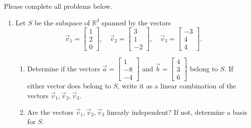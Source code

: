 \documentclass[12pt]{article}
\newcommand{\R}{\mathbb{R}}
\newcommand{\bbm}{\begin{bmatrix}}
\newcommand{\ebm}{\end{bmatrix}}
\begin{document}
\thispagestyle{fancy}
Please complete all problems below.
 \begin{enumerate}
  \item Let $S$ be the subspace of $\R^3$ spanned by the vectors
\[
 \vec{v}_1 = \bbm 1\\2\\0\ebm, \quad \vec{v}_2 = \bbm 3\\1\\-2\ebm, \quad \vec{v}_3 = \bbm -3\\4\\4\ebm.
\]
\begin{enumerate}
 \item Determine if the vectors $\vec{a} = \bbm 1\\-8\\-4\ebm$ and $\vec{b}= \bbm 4\\3\\6\ebm$ belong to $S$. If either vector does belong to $S$, write it as a linear combination of the vectors $\vec{v}_1, \vec{v}_2, \vec{v}_3$.

 \bigskip

 \item Are the vectors $\vec{v}_1, \vec{v}_2, \vec{v}_3$ linearly independent? If not, determine a basis for $S$.
\end{enumerate}

\bigskip





\end{enumerate}
\end{document}

